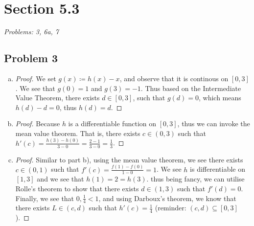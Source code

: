 \documentclass[12pt]{article}
\begin{document}

\section*{Section 5.3}
\textit{Problems: 3, 6a, 7}
\subsection*{Problem 3}
\begin{enumerate}[a).]
    \item {
        \begin{proof}
            We set $g(x) \coloneq h(x) - x$, and observe that it is continous on $[0,3]$.
            We see that $g(0) = 1$ and $g(3) = -1$. 
            Thus based on the Intermediate Value Theorem, there exists $d \in [0,3]$, such that $g(d) = 0$, which means $h(d) - d = 0$, thus $h(d) = d$. 
        \end{proof}
    }
    \item {
        \begin{proof}
            Because $h$ is a differentiable function on $[0,3]$, thus we can invoke the mean value theorem. 
            That is, there exists $c \in (0,3)$ such that $h'(c) = \frac{h(3) - h(0)}{3 - 0} = \frac{2 - 1}{3-0} = \frac{1}{3} $. 
            
        \end{proof}
    }
    \item {
        \begin{proof}
            Similar to part b), using the mean value theorem, we see there exists $c \in (0,1)$ such that $f'(c) = \frac{f(1) - f(0)}{ 1-0} = 1$. 
            We see $h$ is differentiable on $[1,3]$ and we see that $h(1) = 2 = h(3)$.
            thus being fancy, we can utilise Rolle's theorem to show that there exists $d \in (1,3)$ such that $f'(d) = 0$. 
            Finally, we see that $0,\frac{1}{4} < 1$, and using Darboux's theorem, we know that there exists $L \in (c,d)$ such that $h'(c) = \frac{1}{4}$ (reminder: $(c,d) \subseteq [0,3]$). 
            
        \end{proof}
    }
\end{enumerate}
\end{document}
